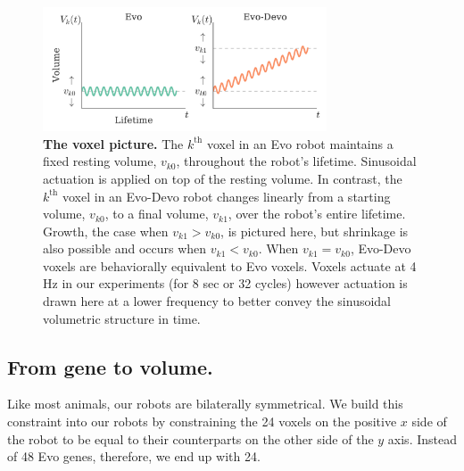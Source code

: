 \begin{figure}
\centering
\includegraphics[width=0.75\textwidth]{Chapter03/img/high_res_illustrations_gecco}
\caption{\label{fig:illustrations} \textbf{The voxel picture.} The $k^{\text{th}}$ voxel in an Evo robot maintains a fixed resting volume, $v_{k0}$, throughout the robot's lifetime. Sinusoidal actuation is applied on top of the resting volume. In contrast, the $k^{\text{th}}$ voxel in an Evo-Devo robot changes linearly from a starting volume, $v_{k0}$, to a final volume, $v_{k1}$, over the robot's entire lifetime. Growth, the case when $v_{k1}>v_{k0}$, is pictured here, but shrinkage is also possible and occurs when $v_{k1}<v_{k0}$. 
When $v_{k1}=v_{k0}$, Evo-Devo voxels are behaviorally equivalent to Evo voxels. 
Voxels actuate at 4 Hz in our experiments (for 8 sec or 32 cycles) however actuation is drawn here at a lower frequency to better convey the sinusoidal volumetric structure in time.}
\end{figure}



\subsection*{From gene to volume.}

Like most animals, our robots are bilaterally symmetrical.
We build this constraint into our robots by constraining the 24 voxels on the positive $x$ side of the robot to be equal to their counterparts on the other side of the $y$ axis.
Instead of 48 Evo genes, therefore, we end up with 24.


